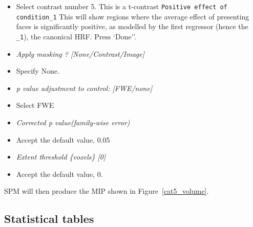 \begin{itemize}
\item Select contrast number 5. This is a t-contrast \texttt{Positive effect of condition\_1} This will show regions where the average effect of presenting faces is significantly positive, as modelled by the first regressor (hence the \texttt{\_1}), the canonical HRF. Press `Done''.
\item \emph{Apply masking ? [None/Contrast/Image]}
\item Specify None.
\item \emph{p value adjustment to control: [FWE/none]}
\item Select FWE
\item \emph{Corrected p value(family-wise error)}
\item Accept the default value, 0.05
\item \emph{Extent threshold \{voxels\} [0]}
\item Accept the default value, 0.
\end{itemize}
SPM will then produce the MIP shown in Figure~\ref{cat5_volume}.

\subsection{Statistical tables}

